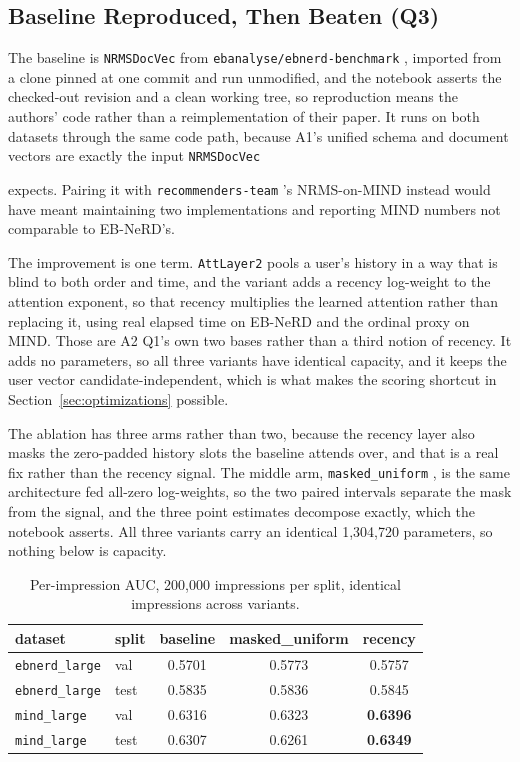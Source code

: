 \documentclass[11pt]{article}
\newcommand{\code}[1]{%
    \colorbox{gray!40}{\texttt{#1}}%
}
\begin{document}
\subsection{Baseline Reproduced, Then Beaten (Q3)}
\label{sec:baseline}

The baseline is \code{NRMSDocVec} from \code{ebanalyse/ebnerd-benchmark},
imported from a clone pinned at one commit and run unmodified, and the
notebook asserts the checked-out revision and a clean working tree, so
reproduction means the authors' code rather than a reimplementation of their
paper. It runs on both datasets through the same code path, because A1's
unified schema and document vectors are exactly the input \code{NRMSDocVec}
expects. Pairing it with \code{recommenders-team}'s NRMS-on-MIND instead would
have meant maintaining two implementations and reporting MIND numbers not
comparable to EB-NeRD's.

The improvement is one term. \code{AttLayer2} pools a user's history in a way
that is blind to both order and time, and the variant adds a recency
log-weight to the attention exponent, so that recency multiplies the learned
attention rather than replacing it, using real elapsed time on EB-NeRD and the
ordinal proxy on MIND. Those are A2 Q1's own two bases rather than a third
notion of recency. It adds no parameters, so all three variants have identical
capacity, and it keeps the user vector candidate-independent, which is what
makes the scoring shortcut in Section~\ref{sec:optimizations} possible.

The ablation has three arms rather than two, because the recency layer also
masks the zero-padded history slots the baseline attends over, and that is a
real fix rather than the recency signal. The middle arm,
\code{masked\_uniform}, is the same architecture fed all-zero log-weights, so
the two paired intervals separate the mask from the signal, and the three
point estimates decompose exactly, which the notebook asserts. All three
variants carry an identical 1,304,720 parameters, so nothing below is
capacity.

\begin{table}[h]
\centering
\begin{tabular}{llccc}
\toprule
dataset & split & baseline & masked\_uniform & recency \\
\midrule
\code{ebnerd\_large} & val  & 0.5701 & 0.5773 & 0.5757 \\
\code{ebnerd\_large} & test & 0.5835 & 0.5836 & 0.5845 \\
\code{mind\_large}   & val  & 0.6316 & 0.6323 & \textbf{0.6396} \\
\code{mind\_large}   & test & 0.6307 & 0.6261 & \textbf{0.6349} \\
\bottomrule
\end{tabular}
\caption{Per-impression AUC, 200,000 impressions per split, identical
impressions across variants.}
\end{table}
\end{document}
